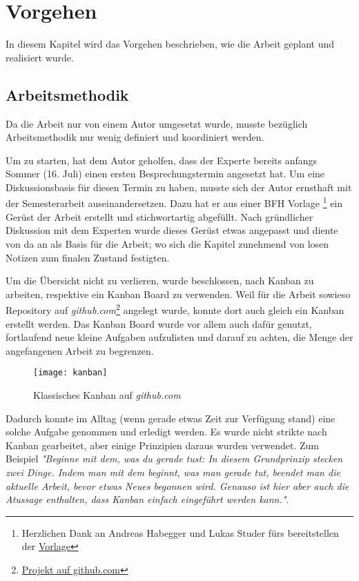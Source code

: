 \section{Vorgehen}
In diesem Kapitel wird das Vorgehen beschrieben, wie die Arbeit geplant und realisiert wurde.

\subsection{Arbeitsmethodik}
Da die Arbeit nur von einem Autor umgesetzt wurde, musste bezüglich Arbeitsmethodik nur wenig definiert und koordiniert werden.

Um zu starten, hat dem Autor geholfen, dass der Experte \prof\space bereits anfangs Sommer (16. Juli) einen ersten Besprechungstermin angesetzt hat. Um eine Diskussionsbasis für diesen Termin zu haben, musste sich der Autor ernsthaft mit der Semesterarbeit auseinandersetzen. Dazu hat er aus einer BFH Vorlage \footnote{Herzlichen Dank an Andreas Habegger und Lukas Studer fürs bereitstellen der \href{https://gitlab.ti.bfh.ch/latex-utils/tpl_latex-thesis}{Vorlage}} ein Gerüst der Arbeit erstellt und stichwortartig abgefüllt. Nach gründlicher Diskussion mit dem Experten wurde dieses Gerüst etwas angepasst und diente von da an als Basis für die Arbeit; wo sich die Kapitel zunehmend von losen Notizen zum finalen Zustand festigten.

Um die Übersicht nicht zu verlieren, wurde beschlossen, nach Kanban zu arbeiten, respektive ein Kanban Board zu verwenden. Weil für die Arbeit sowieso Repository auf \emph{github.com}\footnote{\href{https://github.com/bfh-semesterarbeit/spot-geoprocessing/projects/1}{Projekt auf github.com}} angelegt wurde, konnte dort auch gleich ein Kanban erstellt werden. Das Kanban Board wurde vor allem auch dafür genutzt, fortlaufend neue kleine Aufgaben aufzulisten und darauf zu achten, die Menge der angefangenen Arbeit zu begrenzen.

\begin{figure}[H]
	\centering
	\texttt{[image: kanban]}
	\caption{Klassisches Kanban auf \emph{github.com}}
	\label{fig:Klassisches Kanban}
\end{figure}

Dadurch konnte im Alltag (wenn gerade etwas Zeit zur Verfügung stand) eine solche Aufgabe genommen und erledigt werden. Es wurde nicht strikte nach Kanban gearbeitet, aber einige Prinzipien daraus wurden verwendet. Zum Beispiel \textit{"Beginne mit dem, was du gerade tust:
In diesem Grundprinzip stecken zwei Dinge. Indem man mit dem beginnt, was man gerade tut, beendet man die aktuelle Arbeit, bevor etwas Neues begonnen wird. Genauso ist hier aber auch die Atussage enthalten, dass Kanban einfach eingeführt werden kann."}\cite{kanban2010}.


